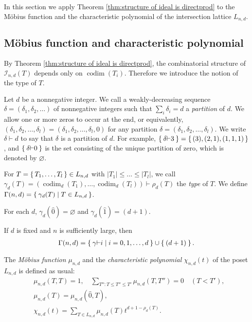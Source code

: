 \documentclass{wstmp}
\begin{document}
In this section 
we apply Theorem \ref{thm:structure of ideal is directprod} 
to the M\"obius function and the characteristic polynomial 
of the intersection lattice $L_{n,d}$. 

\subsection{M\"obius function and characteristic polynomial}
\label{subsec:mobius}
By Theorem \ref{thm:structure of ideal is directprod},
the combinatorial structure of ${\mathcal{I}}_{n,d}(T)$ depends 
only on ${\operatorname{codim}}(T_i)$.
Therefore we introduce the notion of the type of $T$.

Let $d$ be a nonnegative integer.
We call 
a weakly-decreasing sequence $\delta=(\delta_1,\delta_2,\ldots)$
of nonnegative integers such that $\sum_{i} \delta_i=d$
a {\em partition} of $d$.
We allow one or more zeros to occur at the end,
or equivalently,
$(\delta_1,\delta_2,\ldots,\delta_l)=(\delta_1,\delta_2,\ldots,\delta_l,0)$
for any partition $\delta=(\delta_1,\delta_2,\ldots,\delta_l)$.
We write $\delta{\vdash} d$ to say that
$\delta$ is a partition of $d$.
For example, $\Set{ \delta {\vdash} 3 }=\set{(3),(2,1),(1,1,1)}$,
and $\Set{ \delta {\vdash} 0 }$ 
is the set consisting of  the unique partition of zero, 
which is denoted by ${\varnothing}$.

\begin{definition}
For $T=\set{T_1, \dots, T_l}\in L_{n,d}$
with ${\left|{T_1}\right|}\leq \dots \leq {\left|{T_l}\right|}$,
we call 
$\gamma_d(T)=({\operatorname{codim}}_d(T_1),\dots,{\operatorname{codim}}_d(T_l)) {\vdash} \rho_d(T)$
the {\em type} of $T$.  
We define $\Gamma(n,d)=\Set{\gamma_d(T)|T\in L_{n,d}}$.
\end{definition}
\begin{example}
For each $d$, 
$\gamma_d({\hat{0}})={\varnothing}$ and $\gamma_d({\hat{1}})=(d+1)$.
\end{example}
\begin{remark}
If $d$ is fixed and $n$ is sufficiently large,  
then 
\begin{align*}
\Gamma(n,d)=\Set{\gamma{\vdash} i|i=0,1,\ldots,d}\cup \Set{(d+1)}.
\end{align*}
\end{remark}

The {\it M\"obius function} $\mu_{n,d}$ 
and the {\it characteristic polynomial} $\chi_{n,d}(t)$
of the poset $L_{n,d}$ is defined as usual\cite{stanley-introduction}:
\begin{align*}
 &\mu_{n,d}(T,T)=1,   \quad 
\sum_{T''\colon T\leq T''\leq T'} \mu_{n,d}(T,T'')=0 \quad (T < T'),\\
&\mu_{n,d}(T) = \mu_{n,d}({\hat{0}},T),\\
&\chi_{n,d}(t) =\sum_{T\in L_{n,d}} \mu_{n,d}(T) t^{d+1-\rho_d(T)}.
\end{align*}
\end{document}
